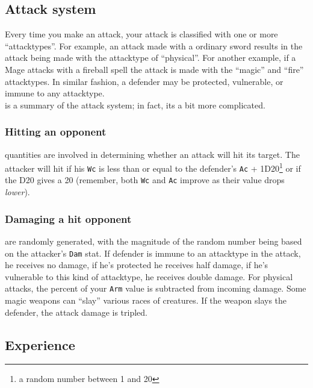 \subsection{Attack system}
\label{sec:combat}

Every time you make an attack, your attack is classified with one or more 
``attacktypes''. For example, an attack made with a ordinary sword
results in the attack being made with the attacktype of ``physical''. 
For another example, if a Mage attacks with a fireball spell the 
attack is made with the ``magic'' and ``fire'' attacktypes. In
similar fashion, a defender may be protected, vulnerable, or immune  
to any attacktype. \\

 is a summary of the attack system; in fact, its a 
bit more complicated. \\ 

\subsubsection{Hitting an opponent}
 quantities are involved in determining whether an attack will
hit its target.  The attacker will hit if his {\tt Wc} is less than or equal
to the 
defender's {\tt Ac} + 1D20\footnote{a random number between 1 and 20} or 
if the D20 gives a 20 (remember, both {\tt Wc} and {\tt Ac} improve as
their value drops {\em lower}).\\ 

\subsubsection{Damaging a hit opponent}
 are randomly generated, with the magnitude of the random number
being based on the attacker's {\tt Dam} stat. 
If defender is immune to an attacktype
in the attack, he receives no damage, if he's protected he receives
half damage, if he's vulnerable to this kind of
attacktype, he receives double damage. For physical attacks, the percent 
of your {\tt Arm} value is subtracted from incoming damage.
Some magic weapons can ``slay'' various races of creatures. If the weapon 
slays the defender, the attack damage is tripled. 


\subsection{Experience}\label{sec:experience}

